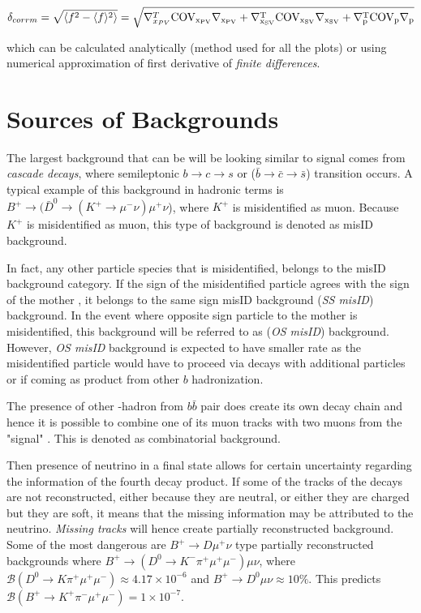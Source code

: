 \begin{equation}
\begin{aligned}
	\delta_{corrm} = \sqrt{ \langle f^{2}-\langle f \rangle^{2} \rangle} = \sqrt{\nabla^{T}_{x_{PV}} \rm{COV_{x_{PV}}} \nabla_{x_{PV}} + \nabla^{T}_{x_{SV}} \rm{COV_{x_{SV}}} \nabla_{x_{SV}} + \nabla^{T}_{p} \rm{COV_{p}} \nabla_{p}} 
\end{aligned}
\end{equation}

which can be calculated analytically (method used for all the plots) or using numerical approximation of first derivative of \textit{finite differences}.

\section{Sources of Backgrounds}
The largest background that can be will be looking similar to signal comes from \textit{cascade decays}, where semileptonic $b \rightarrow c \rightarrow s$ or ($\bar{b} \rightarrow \bar{c} \rightarrow \bar{s}$) transition occurs. A typical example of this background in hadronic terms is $B^{+} \rightarrow (\bar{D}^{0} \rightarrow (K^{+} \rightarrow \mu^{-} \nu) \mu^{+} \nu$), where $K^{+}$ is misidentified as muon. Because $K^{+}$ is misidentified as muon, this type of background is denoted as misID background.

In fact, any other particle species that is misidentified, belongs to the misID background category. If the sign of the misidentified particle agrees with the sign of the mother \Bpm, it belongs to the same sign misID background (\textit{SS misID}) background. In the event where opposite sign particle to the mother \Bpm is misidentified, this background will be referred to as (\textit{OS misID}) background. However, \textit{OS misID} background is expected to have smaller rate as the misidentified particle would have to proceed via decays with additional particles or if coming as product from other $b$ hadronization.

The presence of other \B-hadron from $b\bar{b}$ pair does create its own decay chain and hence it is possible to combine one of its muon tracks with two muons from the "signal" \B. This is denoted as combinatorial background.

Then presence of neutrino in a final state allows for certain uncertainty regarding the information of the fourth decay product. If some of the tracks of the decays are not reconstructed, either because they are neutral, or either they are charged but they are soft, it means that the missing information may be attributed to the neutrino. \textit{Missing tracks} will hence create partially reconstructed background. Some of the most dangerous are ${B^{+} \rightarrow D \mu^{+} \nu}$ type partially reconstructed backgrounds where $B^+ \rightarrow (D^0 \rightarrow K^- \pi^+ \mu^{+} \mu^{-})\mu \nu$, where $\mathcal{B}(D^0 \rightarrow K \pi^+ \mu^{+} \mu^{-}) \approx 4.17\times 10^{-6}$ and $B^{+} \rightarrow D^0 \mu \nu \approx 10 \%$. This predicts $\mathcal{B}(B^+ \rightarrow K^+ \pi^- \mu^+ \mu^{-} ) = 1\times10^{-7}$.


